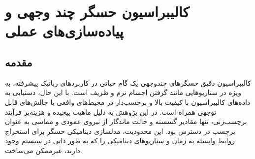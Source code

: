 \chapter{کالیبراسیون حسگر چند وجهی و پیاده‌سازی‌های عملی}
\label{chap:results}
\section{مقدمه} 
کالیبراسیون دقیق حسگرهای چندوجهی یک گام حیاتی در کاربردهای رباتیک پیشرفته، به ویژه در سناریوهایی مانند گرفتن اجسام نرم و ظریف است. با این حال، دستیابی به داده‌های کالیبراسیون با کیفیت بالا و برچسب‌دار در محیط‌های واقعی با چالش‌های قابل توجهی همراه است. در این پژوهش به دلیل ماهیت پیچیده و هزینه‌بر فرآیند برچسب‌زنی، تنها مقادیر گسسته و حالت ماندگار
 از نیروی عمودی و مماسی به عنوان برچسب در دسترس بود. این محدودیت، مدلسازی دینامیکی حسگر برای استخراج روابط وابسته به زمان و سناریو‌های دینامیکی را که به طور ذاتی در سیستم وجود دارند، غیرممکن می‌ساخت.

